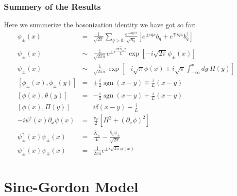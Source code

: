 \subsubsection{Summery of the Results}
Here we summerize the bosonization identity we have got so far:
\begin{eqnarray}
	\phi_\pm(x) &=& \frac{1}{\sqrt{2\pi}} \sum_{q>0} \frac{e^{-a q/2}}{\sqrt{n_q}} \left[e^{\pm i q x} b_{q}+e^{\mp i q x} b_{q}^{\dagger}\right] \\
	\psi_{\pm}(x) &\sim & \frac{1}{\sqrt{2\pi a}} e^{\pm i \frac{2\pi\hat N_{\pm} x}{L}} \exp\left[-i\sqrt{2\pi}\phi_{\pm}(x)\right] \\
	\psi_{\pm}(x) &\sim & \frac{1}{\sqrt{2\pi a}} \exp\left[-i\sqrt{\pi} \phi(x) \pm i\sqrt{\pi} \int^x_{-\infty} dy\ \Pi(y) \right] \\
	\left[\phi_\pm(x), \phi_\pm(y)\right] &=& \pm\frac{i}{2} \operatorname{sgn}(x-y) \mp \frac{i}{L}(x-y) \\
	\left[\phi(x),\theta(y)\right] &=& -\frac{i}{2} \operatorname{sgn}(x-y) + \frac{i}{L}(x-y) \\
	\left[\phi(x), \Pi(y)\right] &=& i \delta(x-y) - \frac{i}{L} \\
	-i\psi^\dagger(x)\partial_x\psi(x) &=& \frac{v_F}{2} \left[\Pi^2 + (\partial_x \phi)^2\right] \\
	\psi^\dagger_\pm(x)\psi_\pm(x) &=& \frac{\hat N_\pm}{L} - \frac{\partial_x \phi_\pm}{\sqrt{2\pi}} \\
	\psi_{\pm}^\dagger(x)\psi_{\mp}(x)  &=& \frac{1}{2\pi a} e^{\pm i\sqrt{4\pi}\phi(x)}
\end{eqnarray}



\section{Sine-Gordon Model}

